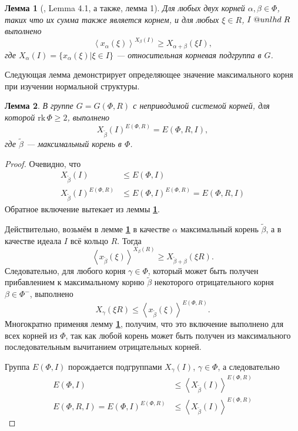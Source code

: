 \documentclass[12pt]{matmex-diploma}
\makeatletter
\newcommand{\slunlhd}{%
  \mathrel{\mathpalette\sl@unlhd\relax}%
}
\newcommand{\sl@unlhd}[2]{%
  \sbox\z@{$#1\lhd$}%
  \sbox\tw@{$#1\leqslant$}%
  \dimen@=\ht\tw@
  \advance\dimen@-\ht\z@
  \ifx#1\displaystyle
    \advance\dimen@ .2pt
  \else
    \ifx#1\textstyle
      \advance\dimen@ .2pt
    \fi
  \fi
  \ooalign{\raisebox{\dimen@}{$\m@th#1\lhd$}\cr$\m@th#1\leqslant$\cr}%
}
\theoremstyle{mystyleni}
\theoremstyle{mystyle}
\newtheorem{lm}{Лемма}
\newcommand\refb[1]{\textbf{\ref{#1}}}
\renewcommand{\le}{\leqslant}
\renewcommand{\ge}{\geqslant}
\renewcommand{\trianglelefteq}{\slunlhd}
\makeatother
\begin{document}
\begin{lm}[\citep{Stavrova2009}, Lemma 4.1, а также\cite{Vavilov1978}, лемма 1]
  \label{transitivity}
  Для любых двух корней $\alpha, \beta \in \Phi$, таких что их сумма также является корнем, и для любых  $\xi \in R$, $I \trianglelefteq R$ выполнено
  $$ \left< x_\alpha(\xi) \right>^{X_\beta(I)} \ge X_{\alpha + \beta}(\xi I), $$  
  где $X_\alpha(I) = \{x_\alpha(\xi) | \xi \in I\}$ --- относительная корневая подгруппа в $G$.
\end{lm}

Следующая лемма демонстрирует определяющее значение максимального корня при изучении нормальной структуры.

\begin{lm} \label{maximalgenerates}
  В группе $G=G(\Phi,R)$ с неприводимой системой корней, для которой $\mathrm{rk}\,\Phi \ge 2$, выполнено
  $$X_{\widetilde\beta}(I)^{E(\Phi,R)} = E(\Phi,R,I),$$
  где $\widetilde\beta$ --- максимальный корень в $\Phi$.
\end{lm}
\begin{proof}
  Очевидно, что
\begin{align*}
  X_{\widetilde\beta}(I) &\le E(\Phi,I) \\
  X_{\widetilde\beta}(I)^{E(\Phi,R)} &\le E(\Phi,I)^{E(\Phi,R)} = E(\Phi,R,I)
\end{align*}
  Обратное включение вытекает из леммы \refb{transitivity}.

  Действительно, возьмём в лемме \refb{transitivity} в качестве $\alpha$ максимальный корень $\widetilde{\beta}$, а в качестве идеала $I$ всё кольцо $R$. Тогда
  $$ \left< x_{\widetilde\beta}(\xi) \right>^{X_\beta(R)} \ge X_{\widetilde\beta + \beta}(\xi R). $$
  Следовательно, для любого корня $\gamma \in \Phi$, который может быть получен прибавлением к максимальному корню $\widetilde\beta$ некоторого отрицательного корня $\beta \in \Phi^-$, выполнено
  $$ X_\gamma(\xi R) \le \left< x_{\widetilde\beta}(\xi)\right>^{E(\Phi,R)} .$$
  Многократно применяя лемму \refb{transitivity}, получим, что это включение выполнено для всех корней из $\Phi$, так как любой корень может быть получен из максимального последовательным вычитанием отрицательных корней.
  
  Группа $E(\Phi,I)$ порождается подгруппами $X_\gamma(I)$, $\gamma \in \Phi$, а следовательно 
\begin{align*}
E(\Phi,I) &\le \left< X_{\widetilde\beta}(I) \right>^{E(\Phi,R)}\\
  E(\Phi,R,I) = E(\Phi,I)^{E(\Phi,R)} &\le \left< X_{\widetilde\beta}(I) \right>^{E(\Phi,R)}
\end{align*}
\end{proof}
\end{document}

